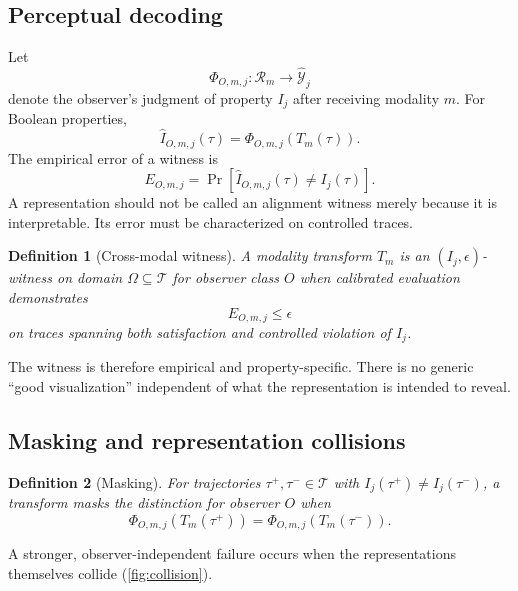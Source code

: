 \documentclass[11pt]{article}
\newtheorem{definition}{Definition}
\newcommand{\T}{\mathcal{T}}
\newcommand{\R}{\mathcal{R}}
\begin{document}
\subsection{Perceptual decoding}
Let
\begin{equation}
\Phi_{O,m,j}:\R_m\rightarrow\widehat{\mathcal{Y}}_j
\end{equation}
denote the observer's judgment of property $I_j$ after receiving modality $m$. For Boolean properties,
\begin{equation}
\widehat I_{O,m,j}(\tau)=\Phi_{O,m,j}(T_m(\tau)).
\end{equation}
The empirical error of a witness is
\begin{equation}
E_{O,m,j}=\Pr\!\left[\widehat I_{O,m,j}(\tau)\neq I_j(\tau)\right].
\end{equation}
A representation should not be called an alignment witness merely because it is interpretable. Its error must be characterized on controlled traces.

\begin{definition}[Cross-modal witness]
A modality transform $T_m$ is an $(I_j,\epsilon)$-\emph{witness} on domain $\Omega\subseteq\T$ for observer class $O$ when calibrated evaluation demonstrates
\begin{equation}
E_{O,m,j}\leq\epsilon
\end{equation}
on traces spanning both satisfaction and controlled violation of $I_j$.
\end{definition}

The witness is therefore empirical and property-specific. There is no generic ``good visualization'' independent of what the representation is intended to reveal.

\subsection{Masking and representation collisions}
\begin{definition}[Masking]
For trajectories $\tau^+,\tau^-\in\T$ with $I_j(\tau^+)\neq I_j(\tau^-)$, a transform masks the distinction for observer $O$ when
\begin{equation}
\Phi_{O,m,j}(T_m(\tau^+))=\Phi_{O,m,j}(T_m(\tau^-)).
\end{equation}
\end{definition}

A stronger, observer-independent failure occurs when the representations themselves collide (\cref{fig:collision}).
\end{document}
